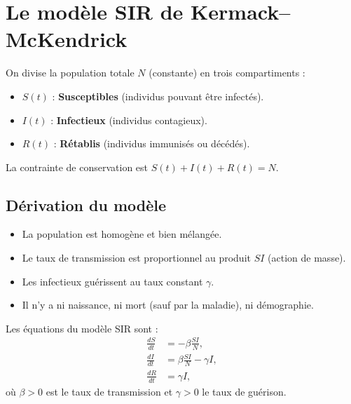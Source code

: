 \section{Le mod\`ele SIR de Kermack--McKendrick}
\label{sec:sir}

\begin{definition}
On divise la population totale $N$ (constante) en trois compartiments :
\begin{itemize}
  \item $S(t)$ : \textbf{Susceptibles} (individus pouvant \^etre infect\'es).
  \item $I(t)$ : \textbf{Infectieux} (individus contagieux).
  \item $R(t)$ : \textbf{R\'etablis} (individus immunis\'es ou d\'ec\'ed\'es).
\end{itemize}
La contrainte de conservation est $S(t)+I(t)+R(t)=N$.
\end{definition}

\subsection{D\'erivation du mod\`ele}

\begin{intuition}[title=\textbf{Hypoth\`eses du mod\`ele SIR}]
\begin{itemize}
  \item La population est homog\`ene et bien m\'elang\'ee.
  \item Le taux de transmission est proportionnel au produit $SI$
    (action de masse).
  \item Les infectieux gu\'erissent au taux constant $\gamma$.
  \item Il n'y a ni naissance, ni mort (sauf par la maladie), ni
    d\'emographie.
\end{itemize}
\end{intuition}

Les \'equations du mod\`ele SIR sont :
\begin{align}
  \frac{dS}{dt} &= -\beta\frac{SI}{N}, \label{eq:sir_s}\\
  \frac{dI}{dt} &= \beta\frac{SI}{N} - \gamma I, \label{eq:sir_i}\\
  \frac{dR}{dt} &= \gamma I, \label{eq:sir_r}
\end{align}
o\`u $\beta>0$ est le taux de transmission et $\gamma>0$ le taux de
gu\'erison.


